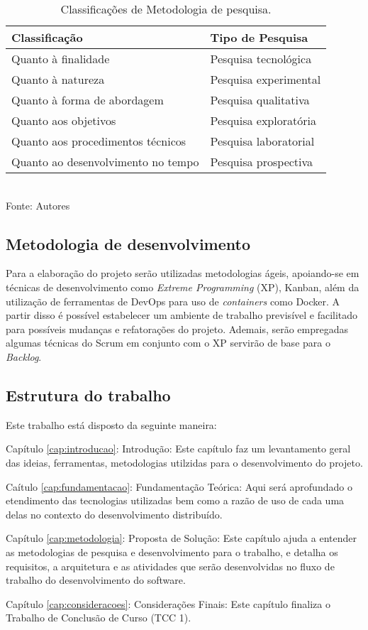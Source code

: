 \begin{table}
    \centering
    \caption{Classificações de Metodologia de pesquisa.}
    \begin{tabular}{|l|l|}
        \hline
        \textbf{Classificação}            & \textbf{Tipo de Pesquisa}\\ 
        \hline
        Quanto à finalidade               & Pesquisa tecnológica \\ 
        \hline
        Quanto à natureza                 & Pesquisa experimental \\ 
        \hline
        Quanto à forma de abordagem       & Pesquisa qualitativa \\
        \hline
        Quanto aos objetivos              & Pesquisa exploratória \\
        \hline
        Quanto aos procedimentos técnicos & Pesquisa laboratorial \\        
        \hline
        Quanto ao desenvolvimento no tempo & Pesquisa prospectiva \\     
    \end{tabular}
    \label{tab:tipo_pesquisa}
    \vspace{5mm} \\ 
    {\footnotesize Fonte: Autores}
\end{table}

\subsection{Metodologia de desenvolvimento}

Para a elaboração do projeto serão utilizadas metodologias ágeis, apoiando-se em técnicas de desenvolvimento como \textit{Extreme Programming} (XP), Kanban, além da utilização de ferramentas de DevOps para uso de \textit{containers} como Docker. A partir disso é possível estabelecer um ambiente de trabalho previsível e facilitado para possíveis mudanças e refatorações do projeto. Ademais, serão empregadas algumas técnicas do Scrum em conjunto com o XP servirão de base para o \textit{Backlog}.

\subsection{Estrutura do trabalho}

Este trabalho está disposto da seguinte maneira:

Capítulo \ref{cap:introducao}: Introdução: Este capítulo faz um levantamento geral das ideias, ferramentas, metodologias utilzidas para o desenvolvimento do projeto.

Caítulo \ref{cap:fundamentacao}: Fundamentação Teórica: Aqui será aprofundado o etendimento das tecnologias utilizadas bem como a razão de uso de cada uma delas no contexto do desenvolvimento distribuído.

Capítulo \ref{cap:metodologia}: Proposta de Solução: Este capítulo ajuda a entender as metodologias de pesquisa e desenvolvimento para o trabalho, e detalha os requisitos, a arquitetura e as atividades que serão desenvolvidas no fluxo de trabalho do desenvolvimento do software.

Capítulo \ref{cap:consideracoes}: Considerações Finais: Este capítulo finaliza o Trabalho de Conclusão de Curso (TCC 1).